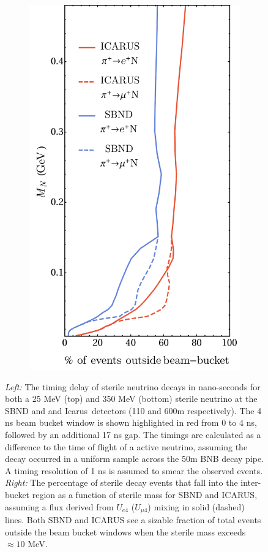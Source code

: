 \documentclass[11pt, a4paper]{article}
\def\icarus{Icarus}
\begin{document}
\begin{figure}[t]
\begin{subfigure}[c]{0.32\textwidth}
\includegraphics[width=\textwidth]{figures/line_plots_long.pdf} \end{subfigure}
\caption{\label{fig:timing} \emph{Left:} The timing delay of sterile neutrino
decays in nano-seconds for both a 25 MeV (top) and 350 MeV (bottom) sterile
neutrino at the SBND and and \icarus\ detectors (110 and 600m respectively).
The 4 ns beam bucket window is shown highlighted in red from 0 to 4 ns,
followed by an additional 17 ns gap. The timings are calculated as a difference
to the time of flight of a active neutrino, assuming the decay occurred in a
uniform sample across the 50m BNB decay pipe. A timing resolution of 1 ns is
assumed to smear the observed events. \emph{Right:} The percentage of sterile
decay events that fall into the inter-bucket region as a function of sterile
mass for SBND and ICARUS, assuming a flux derived from $U_{e4}$ ($U_{\mu 4}$)
mixing in solid (dashed) lines. Both SBND and ICARUS see a sizable fraction of
total events outside the beam bucket windows when the sterile mass exceeds
$\approx10$ MeV.  }

\end{figure}
\end{document}
